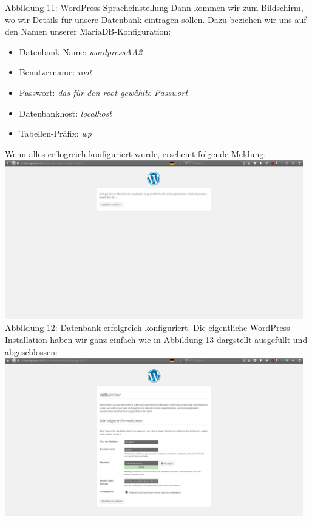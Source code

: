 \documentclass{article}
\begin{document}
	Abbildung 11: WordPress Spracheinstellung
	\newline
	\newline
	Dann kommen wir zum Bildschirm, wo wir Details für unsere Datenbank eintragen sollen. Dazu beziehen wir uns auf den Namen unserer MariaDB-Konfiguration:
	\begin{itemize}
	\item Datenbank Name: \textit{wordpressAA2}
	\end{itemize}
	\begin{itemize}
	\item Benutzername: \textit{root}
	\end{itemize}
	\begin{itemize}
	\item Passwort: \textit{das für den root gewählte Passwort}
	\end{itemize}
	\begin{itemize}
	\item Datenbankhost: \textit{localhost}
	\end{itemize}
	\begin{itemize}
	\item Tabellen-Präfix: \textit{wp}
	\end{itemize}
	Wenn alles erflogreich konfiguriert wurde, erscheint folgende Meldung:
	\newline
	\newline
	\includegraphics[width=13cm]{../Pics/37-wordpress-databas_ok}
	Abbildung 12: Datenbank erfolgreich konfiguriert.
	\newline
	\newline
	Die eigentliche WordPress-Installation haben wir ganz einfach wie in Abbildung 13 dargstellt ausgefüllt und abgeschlossen:
	\newline
	\newline
	\includegraphics[width=13cm]{../Pics/38-wordpress-angaben}
\end{document}
